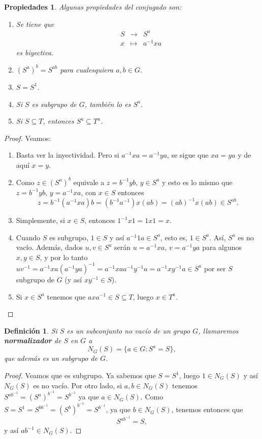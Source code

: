 \documentclass[12pt]{article}
\newtheorem{definition}[theorem]{Definición}
\newtheorem{properties}{Propiedades}[theorem]
\begin{document}
\begin{properties}Algunas propiedades del conjugado son: 
\begin{enumerate}
\item Se tiene que $$\begin{array}{rccl}
&S & \longrightarrow & S^a\\
&x & \longmapsto &a^{-1}xa
\end{array}
$$ es biyectiva.
\item $(S^a)^b = S^{ab}$ para cualesquiera $a,b \in G$.
\item $S = S^1$.
\item Si $S$ es subgrupo de $G$, también lo es $S^a$.
\item Si $S \subseteq T$, entonces $S^a \subseteq T^a$.
\end{enumerate}
\end{properties}
\begin{proof}
Veamos: 
\begin{enumerate}
\item Basta ver la inyectividad. Pero si $a^{-1}xa = a^{-1}ya$, se sigue que $xa = ya$ y de aquí $x=y$.
\item Como $z \in (S^a)^b$ equivale a $z = b^{-1}yb$, $y \in S^a$ y esto es lo mismo que $z = b^{-1}yb$, $y = a^{-1}xa$, con $x \in S$ entonces $$z = b^{-1}(a^{-1}xa)b = (b^{-1}a^{-1})x(ab) = (ab)^{-1}x(ab) \in S^{ab}.$$
\item Simplemente, si $x \in S$, entonces $1^{-1}x1 = 1x1 = x$.
\item Cuando $S$ es subgrupo, $1 \in S$ y así $a^{-1}1a \in S^a$, esto es, $1 \in S^a$. Así, $S^a$ es no vacío. Además, dados $u,v \in S^a$ serán $u = a^{-1}xa$, $v = a^{-1}ya$ para algunos $x,y \in S$, y por lo tanto $uv^{-1} = a^{-1}xa(a^{-1}ya)^{-1} = a^{-1}xa a^{-1}y^{-1}a = a^{-1}xy^{-1}a \in S^a$ por ser $S$ subgrupo de $G$ (y así $xy^{-1} \in S$).
\item Si $x \in S^a$ tenemos que $axa^{-1} \in S \subseteq T$, luego $x \in T^a$.
\end{enumerate}

\end{proof}

\begin{definition}Si $S$ es un subconjunto no vacío de un grupo $G$, llamaremos \textbf{normalizador} de $S$ en $G$ a $$N_G(S) = \lbrace a \in G : S^a = S \rbrace,$$ que además es un subgrupo de $G$.
\end{definition}
\begin{proof}
Veamos que es subgrupo. Ya sabemos que $S = S^1$, luego $1 \in N_G(S)$ y así $N_G(S)$ es no vacío. Por otro lado, si $a,b \in N_G(S)$ tenemos $S^{ab^{-1}} = (S^a)^{b^{-1}} = S^{b^{-1}}$ ya que $a \in N_G(S)$. Como $S = S^1 = S^{bb^{-1}} = (S^b)^{b^{-1}} = S^{b^{-1}}$, ya que $b \in N_G(S)$, tenemos entonces que $$S^{ab^{-1}} = S,$$ y así $ab^{-1} \in N_G(S)$.

\end{proof}
\end{document}

